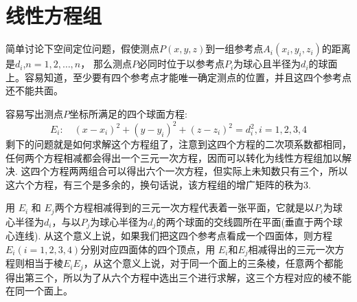 
\section{线性方程组}
\label{sec:linear-equations-system}

\begin{example}[简单的三维定位]
  简单讨论下空间定位问题，假使测点$P(x,y,z)$到一组参考点$A_i(x_i,y_i,z_i)$的距离是$d_i$,$n=1,2,\ldots,n$， 那么测点$P$必同时位于以参考点$P_i$为球心且半径为$d_i$的球面上。容易知道，至少要有四个参考点才能唯一确定测点的位置，并且这四个参考点还不能共面。

  容易写出测点$P$坐标所满足的四个球面方程:
  \[ E_i: \quad (x-x_i)^2+(y-y_i)^2+(z-z_i)^2=d_i^2, i = 1,2,3,4 \]
  剩下的问题就是如何求解这个方程组了，注意到这四个方程的二次项系数都相同，任何两个方程相减都会得出一个三元一次方程，因而可以转化为线性方程组加以解决. 这四个方程两两组合可以得出六个一次方程，但实际上未知数只有三个，所以这六个方程，有三个是多余的，换句话说，该方程组的增广矩阵的秩为3.

  用 $E_i$ 和 $E_j$两个方程相减得到的三元一次方程代表着一张平面，它就是以$P_i$为球心半径为$d_i$，与以$P_j$为球心半径为$d_j$的两个球面的交线圆所在平面(垂直于两个球心连线). 从这个意义上说，如果我们把这四个参考点看成一个四面体，则方程$E_i(i=1,2,3,4)$分别对应四面体的四个顶点，用 $E_i$和$E_j$相减得出的三元一次方程则相当于棱$E_iE_j$，从这个意义上说，对于同一个面上的三条棱，任意两个都能得出第三个，所以为了从六个方程中选出三个进行求解，这三个方程对应的棱不能在同一个面上。
\end{example}
